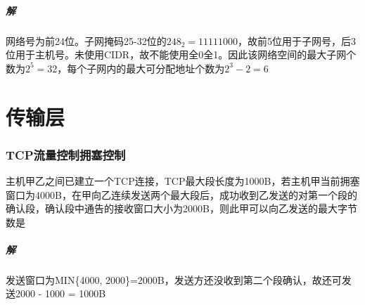 \subparagraph{解}
网络号为前24位。子网掩码25-32位的\(248_2 = 11111000\)，故前5位用于子网号，后3位用于主机号。未使用CIDR，故不能使用全0全1。因此该网络空间的最大子网个数为\(2^5 = 32\)，每个子网内的最大可分配地址个数为\(2^3 - 2 = 6\)


\section{传输层}

\subsubsection{TCP流量控制拥塞控制}
主机甲乙之间已建立一个TCP连接，TCP最大段长度为1000B，若主机甲当前拥塞窗口为4000B，在甲向乙连续发送两个最大段后，成功收到乙发送的对第一个段的确认段，确认段中通告的接收窗口大小为2000B，则此甲可以向乙发送的最大字节数是

\subparagraph{解}
发送窗口为MIN\{4000, 2000\}=2000B，发送方还没收到第二个段确认，故还可发送2000 - 1000 = 1000B


